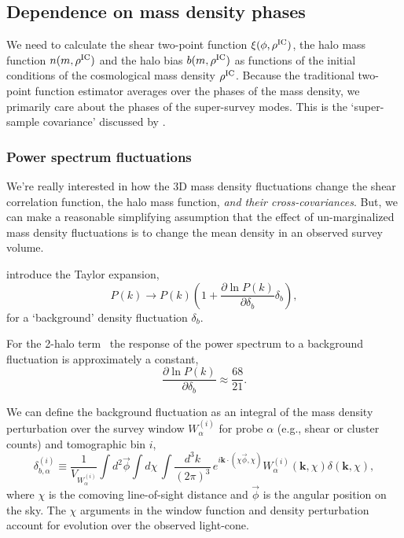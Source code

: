 \documentclass[preprint]{aastex}
\newcommand{\kv}{\mathbf{k}}
\newcommand{\phiv}{\vec{\phi}}
\newcommand{\skyangle}{\phi}
\newcommand{\rhoic}{\rho^{\rm IC}}
\begin{document}
\subsection{Dependence on mass density phases} %
\label{sub:dependence_on_mass_density_phases}
We need to calculate the shear two-point function $\xi(\skyangle, \rhoic)$, 
the halo mass function $n(m, \rhoic)$
and the halo bias $b(m, \rhoic)$ as functions of the initial conditions of the 
cosmological mass density $\rhoic$. 
Because the traditional two-point function estimator averages over the phases 
of the mass density, we primarily care about the phases of the super-survey 
modes. This is the `super-sample covariance' discussed by 
\citet{takada2013}.

\subsubsection{Power spectrum fluctuations}
We're really interested in how the 3D mass density fluctuations change the
shear correlation function, the halo mass function, \emph{and their 
cross-covariances}. But, we can make a reasonable simplifying assumption that 
the effect of un-marginalized mass density fluctuations is to change the mean density 
in an observed survey volume. 

\citet{takada2013} introduce the Taylor expansion,
\begin{equation}\label{eq:power_perturbation}
	P(k) \rightarrow P(k) \left(
	1 + \frac{\partial \ln P(k)}{\partial \delta_b} \delta_b\right),
\end{equation}
for a `background' density fluctuation $\delta_b$.

For the 2-halo term~\citep[eq. 39 of][]{takada2013} the response of the power spectrum 
to a background fluctuation is approximately a constant, 
\begin{equation}
	\frac{\partial \ln P(k)}{\partial \delta_b} \approx 
	\frac{68}{21}.
\end{equation}

We can define the background fluctuation as an integral of the 
mass density perturbation over the survey window $W^{(i)}_{\alpha}$ for  
probe $\alpha$ (e.g., shear or cluster counts) and tomographic bin $i$,
\begin{equation}
	\delta_{b,\alpha}^{(i)} \equiv \frac{1}{V_{W_{\alpha}^{(i)}}}
	\int d^{2}\phiv \int d\chi\,
	\int \frac{d^{3}k}{(2\pi)^3}\,
	e^{i \kv\cdot(\chi\phiv, \chi)}
	W^{(i)}_{\alpha}(\kv, \chi) \delta(\kv, \chi),
\end{equation}
where $\chi$ is the comoving line-of-sight distance and $\phiv$ is the 
angular position on the sky. The $\chi$ arguments in the window function 
and density perturbation account for evolution over the observed light-cone.
\end{document}
